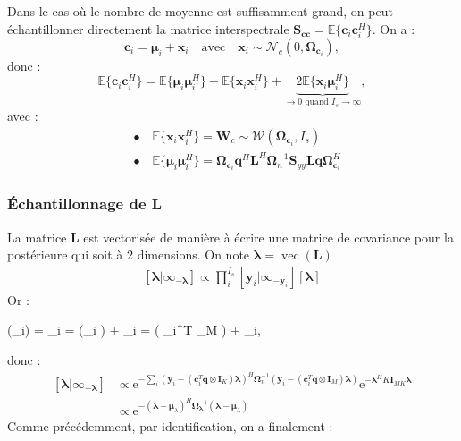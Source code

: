 \documentclass[ 12pt]{article}
\renewenvironment{equation}{\vspace{-0.2cm}\begin{oldequation}}{\vspace{-0.2cm}\end{oldequation}}
\newcommand{\e}{\mathrm{e}}
\begin{document}
Dans le cas où le nombre de moyenne est suffisamment grand, on peut échantillonner directement la matrice interspectrale \hbox{$\bm{S_{cc}} =  \mathbb{E}\{\bm{c}_i\bm{c}_i^H\}$}. On a : 
\begin{equation*}
	    \bm{c}_i = \bm{\mu}_i + \bm{x}_i \quad\text{avec}\quad \bm{x}_i \sim \mathcal{N}_c(0, \bm{\Omega}_{\bm{c}_i}),
\end{equation*}
donc : 
\begin{equation*}
        \mathbb{E}\{\bm{c}_i\bm{c}_i^H\} =  \mathbb{E}\{\bm{\mu}_i \bm{\mu}_i^H\} + \mathbb{E}\{\bm{x}_i \bm{x}_i^H\} + \underbrace{ 2\mathbb{E}\{\bm{x}_i \bm{\mu}_i^H\}}_{\rightarrow 0 \text{ quand } I_{s}\rightarrow \infty},
\end{equation*}
avec : 
\begin{align*}
& \bullet \quad\mathbb{E}\{\bm{x}_i \bm{x}_i^H\} = \bm{W}_c \sim \mathcal{W}(\bm{\Omega}_{\bm{c}_i} , I_{s})\\
& \bullet \quad  \mathbb{E}\{\bm{\mu}_i \bm{\mu}_i^H\}  =  \bm{\Omega}_{\bm{c}_i} \bm{q}^H\bm{L}^H  \bm{\Omega}_n^{-1}\bm{S}_{yy} \bm{Lq}  \bm{\Omega}_{\bm{c}_i}^H
\end{align*}

 

\subsubsection[]{Échantillonnage de $\bm{L}$}
La matrice $\bm{L}$ est vectorisée de manière à écrire une matrice de covariance pour la postérieure qui soit à 2 dimensions. On note $\bm{\lambda}=\operatorname{vec}(\bm{L})$
\begin{align*}
	\left[ \bm{\lambda}| \infty_{-\bm{\lambda}}  \right] \propto \prod_i^{I_{s}} [\bm{y}_i | \infty_{-\bm{y}_i}][\bm{\lambda}]
\end{align*}
Or : 
\begin{equation}
        (_i) = _i = (_i ) + _i  = \left( _i^T  \otimes {}_M \right) \bm{\lambda} + _i,
\end{equation}
donc : 
\begin{align*}
        \left[ \bm{\lambda}| \infty_{-\bm{\lambda}}  \right] &\propto \e^{-\sum_i  \left( \bm{y}_i -  \left( \bm{c}_i^T \bm{q} \otimes \bm{I}_K \right) \bm{\lambda} \right) ^H \bm{\Omega}_n^{-1}  \left( \bm{y}_i -  \left( \bm{c}_i^T \bm{q} \otimes \bm{I}_M \right) \bm{\lambda} \right) }
        \e^{- \bm{\lambda}^H K\bm{I}_{MK} \bm{\lambda} }\\
&\propto \e^{ - (\bm{\lambda}- \bm{\mu}_\lambda)^H \bm{\Omega}^{-1}_{\bm{\lambda}}     (\bm{\lambda}- \bm{\mu}_\lambda)  }
\end{align*}
Comme précédemment, par identification, on a finalement : \\
\end{document}
